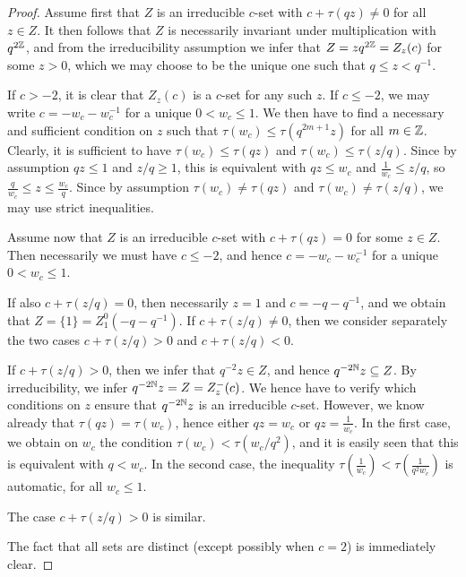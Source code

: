 \begin{proof} Assume first that $Z$ is an irreducible $c$-set with $c+\tau(qz)\neq 0$ for all $z\in Z$. It then follows that $Z$ is necessarily invariant under multiplication with $q^{2\mathbb{Z}}$, and from the irreducibility assumption we infer that $Z = zq^{2\mathbb{Z}}=Z_z(c)$ for some $z>0$, which we may choose to be the unique one such that $q\leq z<q^{-1}$. 

If $c>-2$, it is clear that $Z_z(c)$ is a $c$-set for any such $z$. If $c\leq -2$, we may write $c=-w_c-w_c^{-1}$ for a unique $0< w_c\leq 1$. We then have to find a necessary and sufficient condition on $z$ such that $\tau(w_c)\leq \tau(q^{2m+1}z)$ for all $m\in \mathbb{Z}$. Clearly, it is sufficient to have $\tau(w_c)\leq \tau(qz)$ and $\tau(w_c)\leq \tau(z/q)$. Since by assumption $qz\leq 1$ and $z/q\geq 1$, this is equivalent with $qz\leq w_c$ and $\frac{1}{w_c}\leq z/q$, so $\frac{q}{w_c}\leq z\leq \frac{w_c}{q}$. Since by assumption $\tau(w_c)\neq \tau(qz)$ and $\tau(w_c)\neq \tau(z/q)$, we may use strict inequalities.

Assume now that $Z$ is an irreducible $c$-set with $c+\tau(qz)=0$ for some $z\in Z$. Then necessarily we must have $c\leq -2$, and hence $c= -w_c-w_c^{-1}$ for a unique $0< w_c\leq 1$. 

If also $c+\tau(z/q)=0$, then necessarily $z=1$ and $c= -q-q^{-1}$, and we obtain that $Z=\{1\}=Z_1^0(-q-q^{-1})$. If $c+\tau(z/q)\neq 0$, then we consider separately the two cases $c+\tau(z/q)>0$ and $c+\tau(z/q)<0$. 

If $c+\tau(z/q)>0$, then we infer that $q^{-2}z\in Z$, and hence $q^{-2\mathbb{N}}z\subseteq Z$. By irreducibility, we infer $q^{-2\mathbb{N}}z = Z= Z_z^-(c)$. We hence have to verify which conditions on $z$ ensure that $q^{-2\mathbb{N}}z$ is an irreducible $c$-set. However, we know already that $\tau(qz)=\tau(w_c)$, hence either $qz = w_c$ or $qz = \frac{1}{w_c}$. In the first case, we obtain on $w_c$ the condition $\tau(w_c)<\tau(w_c/q^2)$, and it is easily seen that this is equivalent with $q<w_c$. In the second case, the inequality $\tau(\frac{1}{w_c})<\tau(\frac{1}{q^2w_c})$ is automatic, for all $w_c\leq 1$.  

The case $c+\tau(z/q)>0$ is similar. 

The fact that all sets are distinct (except possibly when $c=2$) is immediately clear. 
\end{proof} 



